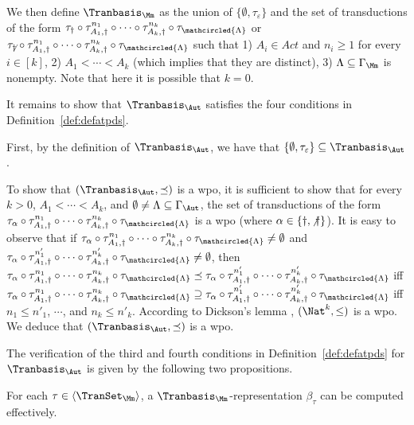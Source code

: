 We then define $\Tranbasis_\Mm$ as the union of $\{\emptyset, \tau_\varepsilon\}$ and the set of transductions of the  form $\tau_{\dag} \circ \tau^{n_1}_{A_1, \dag} \circ \cdots \circ \tau^{n_k}_{A_k, \dag} \circ \tau_{\mathcircled{\Lambda}}$ or $\tau_{\not \dag} \circ \tau^{n_1}_{A_1, \dag} \circ \cdots \circ \tau^{n_k}_{A_k, \dag} \circ \tau_{\mathcircled{\Lambda}}$ such that 
1) $A_i \in Act$ and $n_i \ge 1$ for every $i \in [k]$, 
2) $A_1 < \cdots < A_k$ (which implies that they are distinct), 
3) $\Lambda \subseteq \Gamma_\Mm$ is nonempty. Note that here it is possible that $k=0$.

It remains to show that $\Tranbasis_\Aut$ satisfies the four conditions in Definition~\ref{def:defatpds}.

First, by the definition of $\Tranbasis_\Aut$, we have that $\{\emptyset, \tau_{\varepsilon}\} \subseteq \Tranbasis_\Aut$.

To show that $(\Tranbasis_\Aut, \preceq)$ is a wpo, it is sufficient to show that for every $k > 0$, $A_1 < \cdots < A_k$, and $\emptyset \neq \Lambda \subseteq \Gamma_\Aut$, the set of transductions of the form $\tau_{\alpha} \circ \tau^{n_1}_{A_1, \dag} \circ \cdots \circ \tau^{n_k}_{A_k, \dag} \circ \tau_{\mathcircled{\Lambda}}$  is a wpo (where $\alpha \in \{\dag, \not \dag\}$).  
%
It is easy to observe that if $\tau_{\alpha} \circ \tau^{n_1}_{A_1, \dag} \circ \cdots \circ \tau^{n_k}_{A_k, \dag} \circ \tau_{\mathcircled{\Lambda}} \neq \emptyset$ and $\tau_{\alpha} \circ \tau^{n'_1}_{A_1, \dag} \circ \cdots \circ \tau^{n'_k}_{A_k, \dag} \circ \tau_{\mathcircled{\Lambda}} \neq \emptyset$, 
then 
$\tau_{\alpha} \circ \tau^{n_1}_{A_1, \dag} \circ \cdots \circ \tau^{n_k}_{A_k, \dag} \circ \tau_{\mathcircled{\Lambda}} \preceq \tau_{\alpha} \circ \tau^{n'_1}_{A_1, \dag} \circ \cdots \circ \tau^{n'_k}_{A_k, \dag} \circ \tau_{\mathcircled{\Lambda}}$ iff $\tau_{\alpha} \circ \tau^{n_1}_{A_1, \dag} \circ \cdots \circ \tau^{n_k}_{A_k, \dag} \circ \tau_{\mathcircled{\Lambda}} \supseteq \tau_{\alpha} \circ \tau^{n'_1}_{A_1, \dag} \circ \cdots \circ \tau^{n'_k}_{A_k, \dag} \circ \tau_{\mathcircled{\Lambda}}$ iff $n_1 \le n'_1$, $\cdots$, and $n_k \le n'_k$. According to Dickson's lemma \cite{Kruskal72,Milner1985},  $(\Nat^k, \leq)$ is a wpo. We deduce that  $(\Tranbasis_\Aut, \preceq)$ is a wpo.

The verification of the third and fourth conditions in Definition~\ref{def:defatpds} for $\Tranbasis_\Aut$ is given by the following two propositions.

\begin{proposition}\label{prop-tranbasis-ef}
For each $\tau \in \langle \TranSet_\Mm \rangle$, a $\Tranbasis_\Mm$-representation $\beta_\tau$ can be computed effectively.
\end{proposition}

